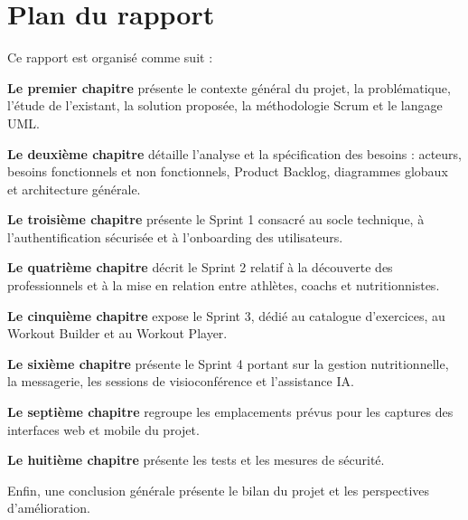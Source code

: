 \section*{Plan du rapport}
\mtcaddsection
Ce rapport est organisé comme suit :

\textbf{Le premier chapitre} présente le contexte général du projet, la problématique, l'étude de l'existant, la solution proposée, la méthodologie Scrum et le langage UML.

\textbf{Le deuxième chapitre} détaille l'analyse et la spécification des besoins : acteurs, besoins fonctionnels et non fonctionnels, Product Backlog, diagrammes globaux et architecture générale.

\textbf{Le troisième chapitre} présente le Sprint 1 consacré au socle technique, à l'authentification sécurisée et à l'onboarding des utilisateurs.

\textbf{Le quatrième chapitre} décrit le Sprint 2 relatif à la découverte des professionnels et à la mise en relation entre athlètes, coachs et nutritionnistes.

\textbf{Le cinquième chapitre} expose le Sprint 3, dédié au catalogue d'exercices, au Workout Builder et au Workout Player.

\textbf{Le sixième chapitre} présente le Sprint 4 portant sur la gestion nutritionnelle, la messagerie, les sessions de visioconférence et l'assistance IA.

\textbf{Le septième chapitre} regroupe les emplacements prévus pour les captures des interfaces web et mobile du projet.

\textbf{Le huitième chapitre} présente les tests et les mesures de sécurité.


Enfin, une conclusion générale présente le bilan du projet et les perspectives d'amélioration.
